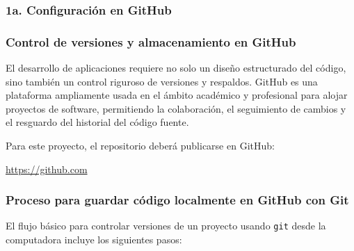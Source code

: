 










\newpage
\subsubsection{1a. Configuración en GitHub}

\subsubsection*{Control de versiones y almacenamiento en GitHub}

El desarrollo de aplicaciones requiere no solo un diseño estructurado del código, sino también un control riguroso de versiones y respaldos. GitHub es una plataforma ampliamente usada en el ámbito académico y profesional para alojar proyectos de software, permitiendo la colaboración, el seguimiento de cambios y el resguardo del historial del código fuente. 

Para este proyecto, el repositorio deberá publicarse en GitHub:
\begin{center}
\url{https://github.com}
\end{center}

\subsubsection*{Proceso para guardar código localmente en GitHub con Git}

El flujo básico para controlar versiones de un proyecto usando \texttt{git} desde la computadora incluye los siguientes pasos:


